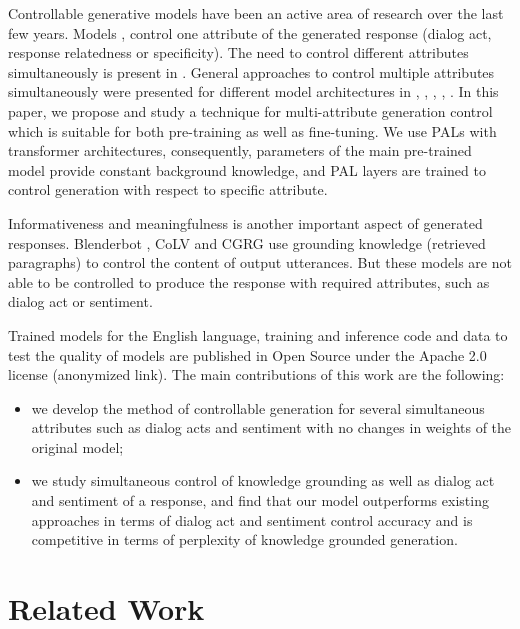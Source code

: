 \documentclass[11pt]{article}
\begin{document}
Controllable generative models have been an active area of research over the last few years. Models \cite{zhao2017learning}, \cite{zhang2018learning} control one attribute of the generated response (dialog act, response relatedness or specificity). The need to control different attributes simultaneously is present in \cite{see2019makes}. General approaches to control multiple attributes simultaneously were presented for different model architectures in \cite{hu2021controllable}, \cite{neural_meta_words}, \cite{attr_alignment}, \cite{side_control}, \cite{phed}. In this paper, we propose and study a technique for multi-attribute generation control which is suitable for both pre-training as well as fine-tuning. We use PALs \cite{stickland2019bert} with transformer architectures, consequently, parameters of the main pre-trained model provide constant background knowledge, and PAL layers are trained to control generation with respect to specific attribute.

Informativeness and meaningfulness is another important aspect of generated responses. Blenderbot \cite{roller2020recipes}, CoLV \cite{zhan2021colv} and CGRG \cite{wu2021controllable} use grounding knowledge (retrieved paragraphs) to control the content of output utterances. But these models are not able to be controlled to produce the response with required attributes, such as dialog act or sentiment.

Trained models for the English language, training and inference code and data to test the quality of models are published in Open Source under the Apache 2.0 license (anonymized link). The main contributions of this work are the following:
\begin{itemize}
    \item we develop the method of controllable generation for several simultaneous attributes such as dialog acts and sentiment with no changes in weights of the original model;
    \item we study simultaneous control of knowledge grounding as well as dialog act and sentiment of a response, and find that our model outperforms existing approaches in terms of dialog act and sentiment control accuracy and is competitive in terms of perplexity of knowledge grounded generation.
\end{itemize}

\section{Related Work}
\end{document}
